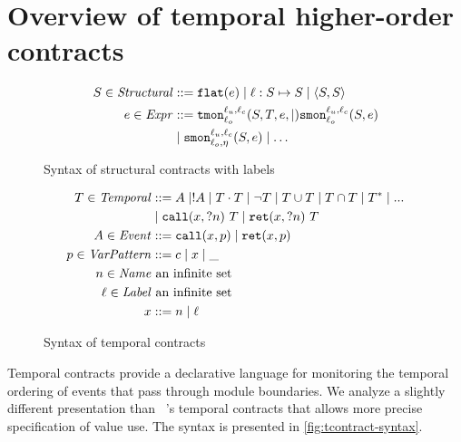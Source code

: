 \documentclass[preprint,onecolumn,9pt]{sigplanconf} %
\begin{document}
\section{Overview of temporal higher-order contracts}

\begin{figure}
  \begin{align*}
    S \in \mathit{Structural} &::= {\tt flat}(e) \mid \ell : S \mapsto S \mid \langle S, S\rangle
\\
    e \in \mathit{Expr} &::= {\tt tmon}{^{\ell_u,\ell_c}_{\ell_o}}({S, T, e, \mid}) {\tt smon}{^{\ell_u,\ell_c}_{\ell_o}}({S, e})
\\ &
                    \mid {\tt smon}{^{\ell_u,\ell_c}_{\ell_o,\eta}}({S, e})
                    \mid \ldots
  \end{align*}
  \caption{Syntax of structural contracts with labels}
  \label{fig:scontract-syntax}
\end{figure}

\begin{figure}
  \begin{align*}
 T \in \mathit{Temporal} &::=
      A \mid ! A
 \mid T \cdot T
 \mid \neg T
 \mid T \cup T
 \mid T \cap T
 \mid T^*
 \mid {\tt ...} \\
&\mid {\tt call}(x, {\tt ?}n)\ T
 \mid {\tt ret}(x, {\tt ?}n)\ T \\
A \in \mathit{Event} &::= {\tt call}(x, p) \mid {\tt ret}(x, p) \\
p \in \mathit{VarPattern} &::= c \mid x \mid \_ \\
n \in \mathit{Name} &\text{ an infinite set} \\
\ell \in \mathit{Label}&\text{ an infinite set} \\
x &::= n \mid \ell
  \end{align*}
  \caption{Syntax of temporal contracts}
  \label{fig:tcontract-syntax}
\end{figure}

Temporal contracts provide a declarative language for monitoring the temporal ordering of events that pass through module boundaries.
%
We analyze a slightly different presentation than ~\citep{ianjohnson:dfm:icfp2011}'s temporal contracts that allows more precise specification of value use.
%
The syntax is presented in \autoref{fig:tcontract-syntax}.
\end{document}
